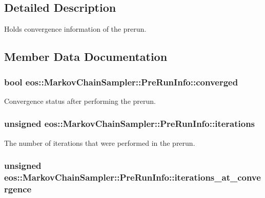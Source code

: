 \subsection{Detailed Description}
Holds convergence information of the prerun. 

\subsection{Member Data Documentation}
\hypertarget{structeos_1_1MarkovChainSampler_1_1PreRunInfo_a182be4f50ae9368aeee0303b4fd29b51}{
\subsubsection[{converged}]{\setlength{\rightskip}{0pt plus 5cm}bool {\bf eos::MarkovChainSampler::PreRunInfo::converged}}}
\label{structeos_1_1MarkovChainSampler_1_1PreRunInfo_a182be4f50ae9368aeee0303b4fd29b51}


Convergence status after performing the prerun. \hypertarget{structeos_1_1MarkovChainSampler_1_1PreRunInfo_a40e24d2a409ae1d2a90c1a49b972b654}{
\subsubsection[{iterations}]{\setlength{\rightskip}{0pt plus 5cm}unsigned {\bf eos::MarkovChainSampler::PreRunInfo::iterations}}}
\label{structeos_1_1MarkovChainSampler_1_1PreRunInfo_a40e24d2a409ae1d2a90c1a49b972b654}


The number of iterations that were performed in the prerun. \hypertarget{structeos_1_1MarkovChainSampler_1_1PreRunInfo_a1f821da9adca5ee92802e51fcb372278}{
\subsubsection[{iterations\_\-at\_\-convergence}]{\setlength{\rightskip}{0pt plus 5cm}unsigned {\bf eos::MarkovChainSampler::PreRunInfo::iterations\_\-at\_\-convergence}}}
\label{structeos_1_1MarkovChainSampler_1_1PreRunInfo_a1f821da9adca5ee92802e51fcb372278}


